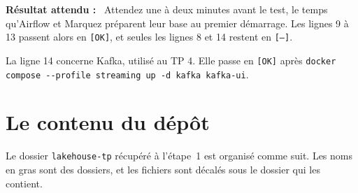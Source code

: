 \documentclass[11pt,a4paper]{article}
\newenvironment{resultat}{\par\medskip\noindent\textbf{Résultat attendu :}\ }{\par\medskip}
\newcommand{\cmd}[1]{\texttt{#1}}
\begin{document}
\begin{resultat}
Attendez une à deux minutes avant le test, le temps qu'Airflow et Marquez préparent leur base au
premier démarrage. Les lignes 9 à 13 passent alors en \texttt{[OK]}, et seules les lignes 8 et 14
restent en \texttt{[--]}.
\end{resultat}

La ligne 14 concerne Kafka, utilisé au TP 4. Elle passe en \texttt{[OK]} après
\cmd{docker compose -{}-profile streaming up -d kafka kafka-ui}.

\section{Le contenu du dépôt}\label{sec:depot}

Le dossier \cmd{lakehouse-tp} récupéré à l'étape~1 est organisé comme suit. Les noms en gras
sont des dossiers, et les fichiers sont décalés sous le dossier qui les contient.

\newcommand{\dossier}[2][0]{\hspace*{#1em}\textbf{\texttt{#2}}}
\newcommand{\fic}[2][1.2]{\hspace*{#1em}\texttt{#2}}
\end{document}
